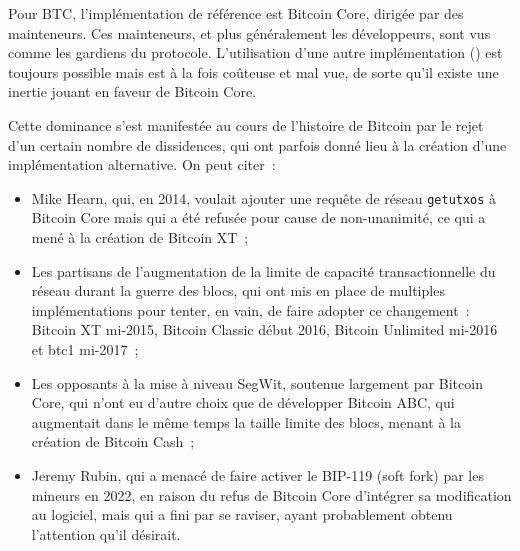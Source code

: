 Pour BTC, l'implémentation de référence est Bitcoin Core, dirigée par des mainteneurs. Ces mainteneurs, et plus généralement les développeurs, sont vus comme les gardiens du protocole. L'utilisation d'une autre implémentation () est toujours possible mais est à la fois coûteuse et mal vue, de sorte qu'il existe une inertie jouant en faveur de Bitcoin Core.


Cette dominance s'est manifestée au cours de l'histoire de Bitcoin par le rejet d'un certain nombre de dissidences, qui ont parfois donné lieu à la création d'une implémentation alternative. On peut citer~:

\begin{itemize}
\item Mike Hearn, qui, en 2014, voulait ajouter une requête de réseau \texttt{getutxos} à Bitcoin Core mais qui a été refusée pour cause de non-unanimité, ce qui a mené à la création de Bitcoin XT~;
\item Les partisans de l'augmentation de la limite de capacité transactionnelle du réseau durant la guerre des blocs, qui ont mis en place de multiples implémentations pour tenter, en vain, de faire adopter ce changement~: Bitcoin XT mi-2015, Bitcoin Classic début 2016, Bitcoin Unlimited mi-2016 et btc1 mi-2017~;
\item Les opposants à la mise à niveau SegWit, soutenue largement par Bitcoin Core, qui n'ont eu d'autre choix que de développer Bitcoin ABC, qui augmentait dans le même temps la taille limite des blocs, menant à la création de Bitcoin Cash~;
\item Jeremy Rubin, qui a menacé de faire activer le BIP-119 (soft fork) par les mineurs en 2022, en raison du refus de Bitcoin Core d'intégrer sa modification au logiciel, mais qui a fini par se raviser, ayant probablement obtenu l'attention qu'il désirait.
\end{itemize}


